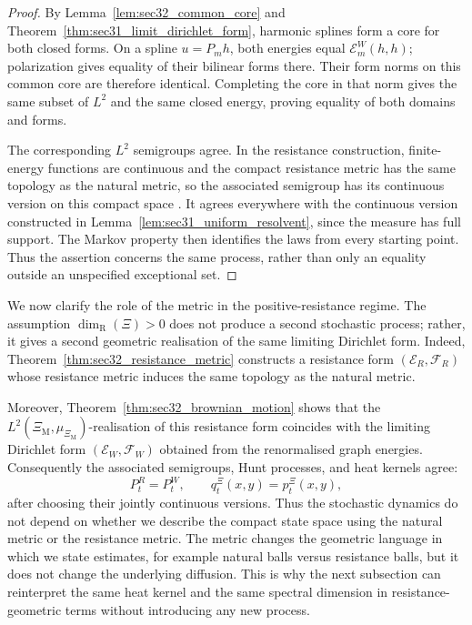 \documentclass{article}
\theoremstyle{plain}
\theoremstyle{definition}
\newcommand{\dimresis}{\dim_\mathrm{R}}
\begin{document}
\begingroup\color{red}
\begin{proof}
By Lemma~\ref{lem:sec32_common_core} and
Theorem~\ref{thm:sec31_limit_dirichlet_form}, harmonic splines form a
core for both closed forms. On a spline $u=P_m h$, both energies equal
$\mathcal E_m^W(h,h)$; polarization gives equality of their bilinear
forms there. Their form norms on this common core are therefore identical.
Completing the core in that norm gives the same subset of $L^2$ and the
same closed energy, proving equality of both domains and forms.

The corresponding $L^2$ semigroups agree. In the resistance construction,
finite-energy functions are continuous and the compact resistance metric
has the same topology as the natural metric, so the associated semigroup
has its continuous version on this compact space
\cite{kigami2001analysis,fukushima1994dirichlet}.
It agrees everywhere with the continuous version constructed in
Lemma~\ref{lem:sec31_uniform_resolvent}, since the measure has full support.
The Markov property then identifies the laws from every starting point.
Thus the assertion concerns the same process, rather than only an
equality outside an unspecified exceptional set.
\end{proof}
\endgroup{}


We now clarify the role of the metric in the positive-resistance regime.
The assumption $\dimresis(\Xi)>0$ does not produce a second stochastic process;
rather, it gives a second geometric realisation of the same limiting Dirichlet form.
Indeed, Theorem~\ref{thm:sec32_resistance_metric} constructs a resistance form
$(\mathcal E_R,\mathcal F_R)$ whose resistance metric induces the same topology as the
natural metric.

Moreover, Theorem~\ref{thm:sec32_brownian_motion} shows that the
$L^2(\Xi_{\mathrm M},\mu_{\Xi_{\mathrm M}})$-realisation of this resistance form coincides with the limiting
Dirichlet form $(\mathcal E_W,\mathcal F_W)$ obtained from the renormalised graph energies.
Consequently the associated semigroups, Hunt processes, and heat kernels agree:
\[
    P_t^R = P_t^W,
    \qquad
    q_t^\Xi(x,y)=p_t^\Xi(x,y),
\]
after choosing their jointly continuous versions.
Thus the stochastic dynamics do not depend on whether we describe the compact state space using the natural metric or the resistance metric.
The metric changes the geometric language in which we state estimates, for example natural balls versus resistance balls, but it does not change the underlying diffusion.
This is why the next subsection can reinterpret the same heat kernel and the same spectral dimension in resistance-geometric terms without introducing any new process.
\end{document}
